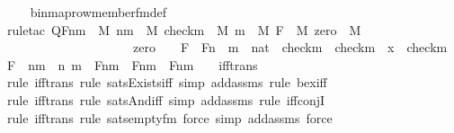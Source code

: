 \begin{isabellebody}
%
\isadelimproof
\isanewline
\ \ %
\endisadelimproof
%
\isatagproof
{}\isamarkupfalse%
\ binmap{\isacharunderscore}{\kern0pt}row{\isacharprime}{\kern0pt}{\isacharunderscore}{\kern0pt}member{\isacharunderscore}{\kern0pt}fm{\isacharunderscore}{\kern0pt}def\ \isanewline
\ \ \isamarkupfalse%
{\isacharparenleft}{\kern0pt}rule{\isacharunderscore}{\kern0pt}tac\ Q{\isacharequal}{\kern0pt}{\isachardoublequoteopen}{\isasymexists}Fnm\ {\isasymin}\ M{\isachardot}{\kern0pt}\ {\isasymexists}nm\ {\isasymin}\ M{\isachardot}{\kern0pt}\ {\isasymexists}checkm\ {\isasymin}\ M{\isachardot}{\kern0pt}\ {\isasymexists}m\ {\isasymin}\ M{\isachardot}{\kern0pt}\ {\isasymexists}F\ {\isasymin}\ M{\isachardot}{\kern0pt}\ {\isasymexists}zero\ {\isasymin}\ M{\isachardot}{\kern0pt}\ \isanewline
\ \ \ \ \ \ \ \ \ \ \ \ \ \ \ \ \ \ \ \ zero\ {\isacharequal}{\kern0pt}\ {}\ {\isasymand}\ F\ {\isasymin}\ Fn\ {\isasymand}\ m\ {\isasymin}\ nat\ {\isasymand}\ checkm\ {\isacharequal}{\kern0pt}\ check{\isacharparenleft}{\kern0pt}m{\isacharparenright}{\kern0pt}\ {\isasymand}\ x\ {\isacharequal}{\kern0pt}\ {\isacharless}{\kern0pt}checkm{\isacharcomma}{\kern0pt}\ F{\isachargreater}{\kern0pt}\ {\isasymand}\ nm\ {\isacharequal}{\kern0pt}\ {\isacharless}{\kern0pt}n{\isacharcomma}{\kern0pt}\ m{\isachargreater}{\kern0pt}\ {\isasymand}\ F{\isacharbackquote}{\kern0pt}nm\ {\isacharequal}{\kern0pt}\ Fnm\ {\isasymand}\ Fnm\ {\isacharequal}{\kern0pt}\ {}{\isachardoublequoteclose}\ \ iff{\isacharunderscore}{\kern0pt}trans{\isacharparenright}{\kern0pt}\isanewline
\ \ \ \isamarkupfalse%
{\isacharparenleft}{\kern0pt}rule\ iff{\isacharunderscore}{\kern0pt}trans{\isacharcomma}{\kern0pt}\ rule\ sats{\isacharunderscore}{\kern0pt}Exists{\isacharunderscore}{\kern0pt}iff{\isacharcomma}{\kern0pt}\ simp\ add{\isacharcolon}{\kern0pt}assms{\isacharcomma}{\kern0pt}\ rule\ bex{\isacharunderscore}{\kern0pt}iff{\isacharparenright}{\kern0pt}{\isacharplus}{\kern0pt}\isanewline
\ \ \ \isamarkupfalse%
{\isacharparenleft}{\kern0pt}rule\ iff{\isacharunderscore}{\kern0pt}trans{\isacharcomma}{\kern0pt}\ rule\ sats{\isacharunderscore}{\kern0pt}And{\isacharunderscore}{\kern0pt}iff{\isacharcomma}{\kern0pt}\ simp\ add{\isacharcolon}{\kern0pt}assms{\isacharcomma}{\kern0pt}\ rule\ iff{\isacharunderscore}{\kern0pt}conjI{}{\isacharparenright}{\kern0pt}\isanewline
\ \ \ \ \isamarkupfalse%
{\isacharparenleft}{\kern0pt}rule\ iff{\isacharunderscore}{\kern0pt}trans{\isacharcomma}{\kern0pt}\ rule\ sats{\isacharunderscore}{\kern0pt}empty{\isacharunderscore}{\kern0pt}fm{\isacharcomma}{\kern0pt}\ force{\isacharcomma}{\kern0pt}\ simp\ add{\isacharcolon}{\kern0pt}assms{\isacharcomma}{\kern0pt}\ force{\isacharparenright}{\kern0pt}\isanewline

\end{isabellebody}
